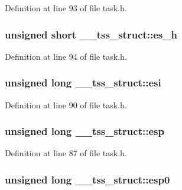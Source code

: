 Definition at line 93 of file task.\+h.

\subsubsection[{\texorpdfstring{es\+\_\+h}{es_h}}]{\setlength{\rightskip}{0pt plus 5cm}unsigned short \+\_\+\+\_\+tss\+\_\+struct\+::es\+\_\+h}\hypertarget{struct____tss__struct_a2578c9748d5a0bd005dead21a80bd5e5}{}\label{struct____tss__struct_a2578c9748d5a0bd005dead21a80bd5e5}


Definition at line 94 of file task.\+h.

\subsubsection[{\texorpdfstring{esi}{esi}}]{\setlength{\rightskip}{0pt plus 5cm}unsigned long \+\_\+\+\_\+tss\+\_\+struct\+::esi}\hypertarget{struct____tss__struct_aa726c858975c07c9f225dfb1143fa638}{}\label{struct____tss__struct_aa726c858975c07c9f225dfb1143fa638}


Definition at line 90 of file task.\+h.

\subsubsection[{\texorpdfstring{esp}{esp}}]{\setlength{\rightskip}{0pt plus 5cm}unsigned long \+\_\+\+\_\+tss\+\_\+struct\+::esp}\hypertarget{struct____tss__struct_aa35a140c36667e429be9f52526e5c019}{}\label{struct____tss__struct_aa35a140c36667e429be9f52526e5c019}


Definition at line 87 of file task.\+h.

\subsubsection[{\texorpdfstring{esp0}{esp0}}]{\setlength{\rightskip}{0pt plus 5cm}unsigned long \+\_\+\+\_\+tss\+\_\+struct\+::esp0}\hypertarget{struct____tss__struct_a7d2c471a5e5070e75f2b11c70fa3374c}{}\label{struct____tss__struct_a7d2c471a5e5070e75f2b11c70fa3374c}


